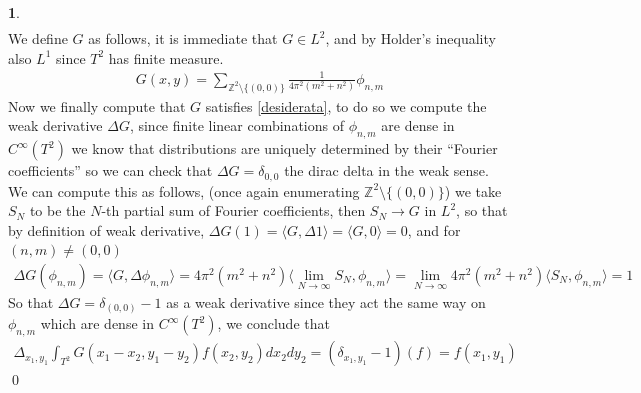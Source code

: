 \documentclass[10.5pt]{article}
\theoremstyle{definition}
\newtheorem{pb}{}
\newcommand{\set}[1]{\{#1\}}
\newcommand{\gen}[1]{\langle#1\rangle}
\begin{document}
\begin{pb}
\begin{align}
        \end{align}
        We define \(G\) as follows, it is immediate that \(G \in L^2\), and by Holder's inequality also \(L^1\) since \(T^2\) has finite measure.
        \begin{align}
            G(x,y) = \sum_{\mathbb{Z}^2 \setminus \set{(0,0)}} \frac{1}{4\pi ^2(m^2 + n^2)}\phi_{n,m}
        \end{align}
        Now we finally compute that \(G\) satisfies \eqref{desiderata}, to do so we compute the weak derivative \(\Delta G\), since finite linear combinations of \(\phi_{n,m}\) are dense in \(C^\infty(T^2)\) we know that distributions are uniquely determined by their ``Fourier coefficients'' so we can check that \(\Delta G = \delta_{0,0}\) the dirac delta in the weak sense. We can compute this as follows, (once again enumerating \(\mathbb{Z}^{2} \setminus \set{(0,0)}\)) we take \(S_N\) to be the \(N\)-th partial sum of Fourier coefficients, then \(S_N \to G\) in \(L^2\), so that by definition of weak derivative, \(\Delta G(1) = \gen{G,\Delta 1} = \gen{G,0} = 0\), and for \((n,m) \neq (0,0)\)
        \begin{align}
            \Delta G(\phi_{n,m}) = \gen{G, \Delta \phi_{n,m}} = 4\pi^2(m^2 + n^2)\gen{\lim_{N\to\infty}S_N,\phi_{n,m}} = \lim_{N\to\infty} 4\pi^2(m^2 + n^2) \gen{S_N,\phi_{n,m}} = 1
        \end{align}
        So that \(\Delta G = \delta_{(0,0)} - 1\) as a weak derivative since they act the same way on \(\phi_{n,m}\) which are dense in \(C^\infty(T^2)\), we conclude that
        \begin{align}
            \Delta_{x_1,y_1} \int_{T^2} G(x_1-x_2,y_1-y_2)f(x_2,y_2)dx_2dy_2 = (\delta_{x_1,y_1} - 1)(f) = f(x_1,y_1)
        \end{align} \qed
    \end{pb}
\end{document}
